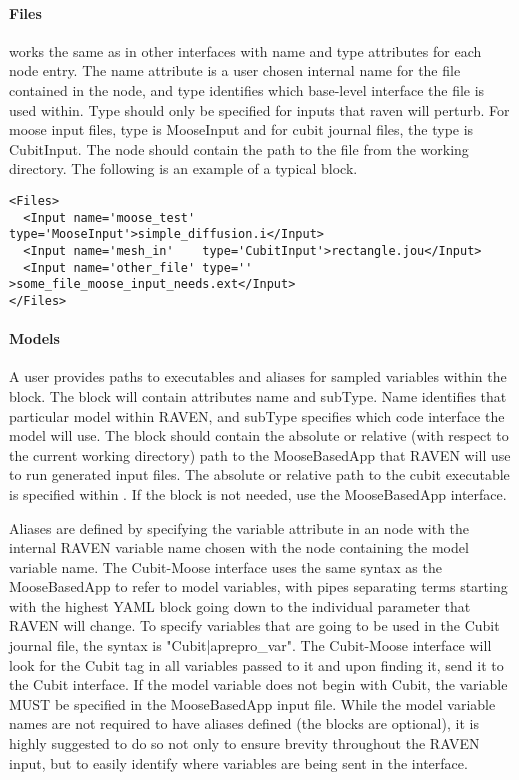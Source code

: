 \paragraph{Files}
 works the same as in other interfaces with name and type 
attributes for each node entry.  The name attribute is a user chosen internal 
name for the file contained in the node, and type identifies which base-level 
interface the file is used within.  Type should only be specified for inputs 
that raven will perturb.  For moose input files, type is MooseInput and for 
cubit journal files, the type is CubitInput.  The node should contain the 
path to the file from the working directory.  The following is an example 
of a typical  block.

\begin{lstlisting}[style=XML]
<Files>
  <Input name='moose_test' type='MooseInput'>simple_diffusion.i</Input>
  <Input name='mesh_in'    type='CubitInput'>rectangle.jou</Input>
  <Input name='other_file' type=''          >some_file_moose_input_needs.ext</Input>
</Files>
\end{lstlisting}

\paragraph{Models}
A user provides paths to executables and aliases for sampled variables within the 
 block.  The  block will contain attributes name and 
subType.  Name identifies that particular  model within RAVEN, and 
subType specifies which code interface the model will use. The  
block should contain the absolute or relative (with respect to the current working 
directory) path to the MooseBasedApp that RAVEN will use to run generated input 
files.  The absolute or relative path to the cubit executable is specified within 
.  If the  block is not needed, use the 
MooseBasedApp interface.

Aliases are defined by specifying the variable attribute in an  node with 
the internal RAVEN variable name chosen with the node containing the model 
variable name.  The Cubit-Moose interface uses the same syntax as the 
MooseBasedApp to refer to model variables, with pipes separating terms starting 
with the highest YAML block going down to the individual parameter that RAVEN 
will change.  To specify variables that are going to be used in the Cubit 
journal file, the syntax is "Cubit|aprepro\_var".  The Cubit-Moose interface 
will look for the Cubit tag in all variables passed to it and upon finding it, 
send it to the Cubit interface.  If the model variable does not begin with Cubit, 
the variable MUST be specified in the MooseBasedApp input file.  While the model 
variable names are not required to have aliases defined (the  
blocks are optional), it is highly suggested to do so not only to ensure brevity 
throughout the RAVEN input, but to easily identify where variables are being sent 
in the interface.

